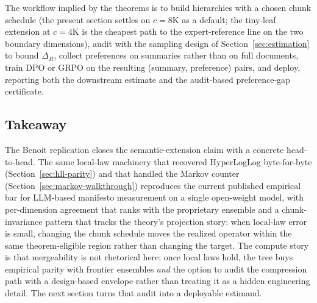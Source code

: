 The workflow implied by the theorems is to build hierarchies with a chosen chunk schedule (the present section settles on $c = 8\mathrm{K}$ as a default; the tiny-leaf extension at $c = 4\mathrm{K}$ is the cheapest path to the expert-reference line on the two boundary dimensions), audit with the sampling design of Section~\ref{sec:estimation} to bound $\Delta_R$, collect preferences on summaries rather than on full documents, train DPO or GRPO on the resulting (summary, preference) pairs, and deploy, reporting both the downstream estimate and the audit-based preference-gap certificate.

\subsection{Takeaway}

The Benoit replication closes the semantic-extension claim with a
concrete head-to-head. The same local-law machinery that recovered
HyperLogLog byte-for-byte (Section~\ref{sec:hll-parity}) and that
handled the Markov counter (Section~\ref{sec:markov-walkthrough})
reproduces the current published empirical bar for LLM-based
manifesto measurement on a single open-weight model, with per-dimension
agreement that ranks with the proprietary ensemble and a chunk-invariance
pattern that tracks the theory's projection story: when local-law error is
small, changing the chunk schedule moves the realized operator within the
same theorem-eligible region rather than changing the target. The compute story is that
mergeability is not rhetorical here: once local laws hold, the tree
buys empirical parity with frontier ensembles \emph{and} the option to
audit the compression path with a design-based envelope rather than
treating it as a hidden engineering detail. The next section turns
that audit into a deployable estimand.
